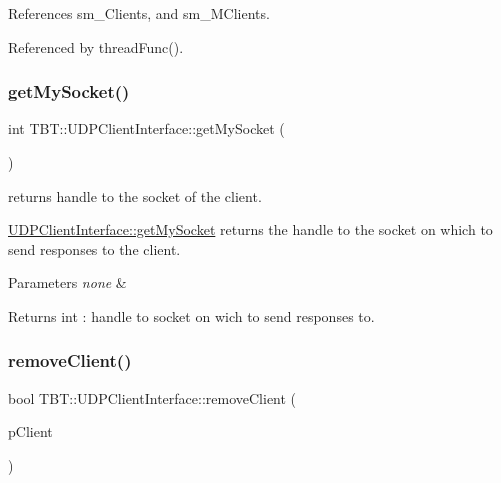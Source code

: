 References sm\+\_\+\+Clients, and sm\+\_\+\+M\+Clients.



Referenced by thread\+Func().

\mbox{\label{classTBT_1_1UDPClientInterface_ac25b06823d045631f3c7b76e9c50f22e_ac25b06823d045631f3c7b76e9c50f22e}} 
\subsubsection{\texorpdfstring{get\+My\+Socket()}{getMySocket()}}
{\footnotesize\ttfamily int T\+B\+T\+::\+U\+D\+P\+Client\+Interface\+::get\+My\+Socket (\begin{DoxyParamCaption}\item[{void}]{ }\end{DoxyParamCaption})\hspace{0.3cm}{\ttfamily [inline]}}

returns handle to the socket of the client.

\hyperlink{classTBT_1_1UDPClientInterface_ac25b06823d045631f3c7b76e9c50f22e_ac25b06823d045631f3c7b76e9c50f22e}{U\+D\+P\+Client\+Interface\+::get\+My\+Socket} returns the handle to the socket on which to send responses to the client.


\begin{DoxyParams}{Parameters}
{\em none} & \\
\hline
\end{DoxyParams}
\begin{DoxyReturn}{Returns}
int \+: handle to socket on wich to send responses to. 
\end{DoxyReturn}
\mbox{\label{classTBT_1_1UDPClientInterface_a1a80ed1e5670443bc35691c9f3d5ff72_a1a80ed1e5670443bc35691c9f3d5ff72}} 
\subsubsection{\texorpdfstring{remove\+Client()}{removeClient()}}
{\footnotesize\ttfamily bool T\+B\+T\+::\+U\+D\+P\+Client\+Interface\+::remove\+Client (\begin{DoxyParamCaption}\item[{\hyperlink{classTBT_1_1UDPClient}{U\+D\+P\+Client} $\ast$}]{p\+Client }\end{DoxyParamCaption})\hspace{0.3cm}{\ttfamily [protected]}}



